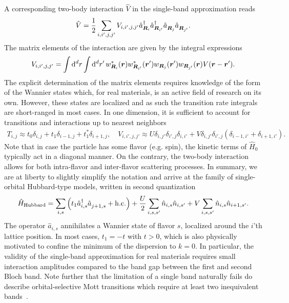 A corresponding two-body interaction $\hat V$ in the single-band approximation reads
\begin{align}
    \hat V = \frac12\sum_{i,i',j,j'}V_{i,i',j,j'}\hat a^\dag_{{\bm R}_i}\hat a^\dag_{{\bm R}_{i'}}\hat a^\pdag_{{\bm R}_j}\hat a^\pdag_{{\bm R}_{j'}}.
\end{align}
The matrix elements of the interaction are given by the integral expressions
\begin{align}
    V_{i,i',j,j'} = \int\mathrm d^dr\int\mathrm d^dr'\,w^*_{{\bm R}_i}({\bm r})w^*_{{\bm R}_{i'}}({\bm r}')w_{{\bm R}_j}({\bm r}')w_{{\bm R}_{j'}}({\bm r})V({\bm r-\bm r'}).
    \label{eq:two_body_interaction_transition_rates}
\end{align}
The explicit determination of the matrix elements requires knowledge of the form of the Wannier states which, for real materials, is an active field of research on its own.
However, these states are localized and as such the transition rate integrals are short-ranged in most cases.
In one dimension, it is sufficient to account for transitions and interactions up to nearest neighbors
\begin{align}
    T_{i,j} \approx t_0\delta_{i,j} + t_1\delta_{i-1,j}+t_1^*\delta_{i+1,j},
    \quad
    V_{i,i',j,j'} \approx U\delta_{i,j'}\delta_{i',j}\delta_{i,i'} + V\delta_{i,j'}\delta_{i',j}(\delta_{i-1,i'}+\delta_{i+1,i'}).
\end{align}
Note that in case the particle has some flavor (e.g. spin), the kinetic terms of $\hat H_0$ typically act in a diagonal manner.
On the contrary, the two-body interaction allows for both intra-flavor and inter-flavor scattering processes.
In summary, we are at liberty to slightly simplify the notation and arrive at the family of single-orbital Hubbard-type models, written in second quantization
\begin{align}
    \hat H_{\rm Hubbard} = \sum_{i,s}\brlr{t_1 \hat a^\dag_{i,s}\hat a^\pdag_{j+1,s} + \hc} + \frac U2\sum_{i,s,s'}\hat n_{i,s}\hat n_{i,s'} + V\sum_{i,s,s'}\hat n_{i,s}\hat n_{i+1,s'}.
    \label{eq:hubbard_hamiltonian}
\end{align}
The operator $\hat a_{i,s}$ annihilates a Wannier state of flavor $s$, localized around the $i$'th lattice position.
In most cases, $t_1 = -t$ with $t>0$, which is also physically motivated to confine the minimum of the dispersion to $k=0$.
In particular, the validity of the single-band approximation for real materials requires small interaction amplitudes compared to the band gap between the first and second Bloch band.
Note further that the limitation of a single band naturally fails do describe orbital-selective Mott transitions which require at least two inequivalent bands~\cite{Anisimov2002,vanDongen2005}.

